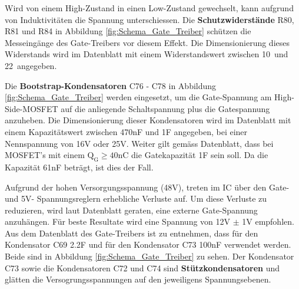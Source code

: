 Wird von einem High-Zustand in einen Low-Zustand gewechselt, kann aufgrund von Induktivitäten die Spannung unterschiessen. Die \textbf{Schutzwiderstände} R80, R81 und R84 in Abbildung \ref{fig:Schema_Gate_Treiber} schützen die Messeingänge des Gate-Treibers vor diesem Effekt.
Die Dimensionierung dieses Widerstands wird im Datenblatt mit einem Widerstandswert zwischen 10\textOmega\ und 22\textOmega\ angegeben.\cite[S.10]{trinamicmotion_control_gmbh__co_kg_tmc6200_2019}



Die \textbf{Bootstrap-Kondensatoren} C76 - C78 in Abbildung \ref{fig:Schema_Gate_Treiber} werden eingesetzt, um die Gate-Spannung am High-Side-MOSFET auf die anliegende Schaltspannung plus die Gatespannung anzuheben.
Die Dimensionierung dieser Kondensatoren wird im Datenblatt mit einem Kapazitätswert zwischen 470nF und 1\textmugreek F angegeben, bei einer Nennspannung von 16V oder 25V. Weiter gilt gemäss Datenblatt, dass bei MOSFET's mit einem $\mathrm{Q_G \geq 40nC}$ die Gatekapazität 1\textmugreek F sein soll. Da die Kapazität 61nF beträgt, ist dies der Fall. \cite[S.10]{trinamicmotion_control_gmbh__co_kg_tmc6200_2019}



Aufgrund der hohen Versorgungsspannung (48V), treten im IC über den Gate- und 5V- Spannungsreglern erhebliche Verluste auf. Um diese Verluste zu reduzieren, wird laut Datenblatt geraten, eine externe Gate-Spannung anzuhängen. Für beste Resultate wird eine Spannung von 12V $\pm$ 1V empfohlen.
Aus dem Datenblatt des Gate-Treibers ist zu entnehmen, dass für den Kondensator C69 2.2\textmugreek F und für den Kondensator C73 100nF verwendet werden. Beide sind in Abbildung \ref{fig:Schema_Gate_Treiber} zu sehen. Der Kondensator C73 sowie die Kondensatoren C72 und C74 sind \textbf{Stützkondensatoren} und glätten die Versogrungsspannungen auf den jeweiligens Spannungsebenen.

